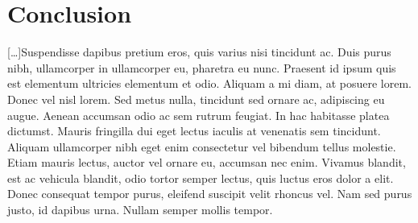 \documentclass[letterpaper]{article}
\begin{document}
\section{Conclusion}
  [\ldots]Suspendisse dapibus pretium eros, quis varius nisi tincidunt ac. Duis purus nibh, ullamcorper in ullamcorper eu, pharetra eu nunc. Praesent id ipsum quis est elementum ultricies elementum et odio. Aliquam a mi diam, at posuere lorem. Donec vel nisl lorem. Sed metus nulla, tincidunt sed ornare ac, adipiscing eu augue. Aenean accumsan odio ac sem rutrum feugiat. In hac habitasse platea dictumst. Mauris fringilla dui eget lectus iaculis at venenatis sem tincidunt. Aliquam ullamcorper nibh eget enim consectetur vel bibendum tellus molestie. Etiam mauris lectus, auctor vel ornare eu, accumsan nec enim. Vivamus blandit, est ac vehicula blandit, odio tortor semper lectus, quis luctus eros dolor a elit. Donec consequat tempor purus, eleifend suscipit velit rhoncus vel. Nam sed purus justo, id dapibus urna. Nullam semper mollis tempor.
  
\nocite{*}


\end{document}
